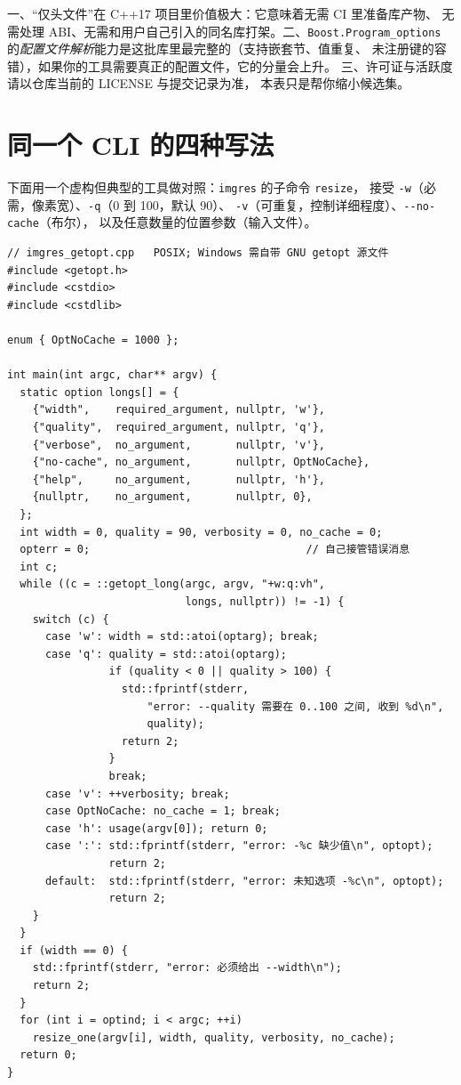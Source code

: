 \documentclass[12pt,a4paper,fontset=fandol]{ctexbook}
\newcommand{\cpp}[1]{C++#1}
\newcommand{\Tp}[1]{\texttt{#1}}
\newcommand{\Opt}[1]{\texttt{-\/-#1}}
\newcommand{\Short}[1]{\texttt{-#1}}
\newcommand{\Bk}{\allowbreak}
\begin{document}
\begin{note}[title={读这张表的三个正确姿势}]
一、``仅头文件''在 \cpp{17} 项目里价值极大：它意味着无需 CI 里准备库产物、
无需处理 ABI、无需和用户自己引入的同名库打架。二、\Tp{Boost\Bk.Program\Bk\_options}
的\emph{配置文件解析}能力是这批库里最完整的（支持嵌套节、值重复、
未注册键的容错），如果你的工具需要真正的配置文件，它的分量会上升。
三、许可证与活跃度请以仓库当前的 LICENSE 与提交记录为准，
本表只是帮你缩小候选集。
\end{note}

\section{同一个 CLI 的四种写法}

下面用一个虚构但典型的工具做对照：\Tp{imgres} 的子命令 \Tp{resize}，
接受 \Short{w}（必需，像素宽）、\Short{q}（0 到 100，默认 90）、
\Short{v}（可重复，控制详细程度）、\Opt{no-cache}（布尔），
以及任意数量的位置参数（输入文件）。

\begin{lstlisting}[caption={写法一：getopt\_long（可移植性最差但零依赖）}]
// imgres_getopt.cpp   POSIX; Windows 需自带 GNU getopt 源文件
#include <getopt.h>
#include <cstdio>
#include <cstdlib>

enum { OptNoCache = 1000 };

int main(int argc, char** argv) {
  static option longs[] = {
    {"width",    required_argument, nullptr, 'w'},
    {"quality",  required_argument, nullptr, 'q'},
    {"verbose",  no_argument,       nullptr, 'v'},
    {"no-cache", no_argument,       nullptr, OptNoCache},
    {"help",     no_argument,       nullptr, 'h'},
    {nullptr,    no_argument,       nullptr, 0},
  };
  int width = 0, quality = 90, verbosity = 0, no_cache = 0;
  opterr = 0;                                  // 自己接管错误消息
  int c;
  while ((c = ::getopt_long(argc, argv, "+w:q:vh",
                            longs, nullptr)) != -1) {
    switch (c) {
      case 'w': width = std::atoi(optarg); break;
      case 'q': quality = std::atoi(optarg);
                if (quality < 0 || quality > 100) {
                  std::fprintf(stderr,
                      "error: --quality 需要在 0..100 之间, 收到 %d\n",
                      quality);
                  return 2;
                }
                break;
      case 'v': ++verbosity; break;
      case OptNoCache: no_cache = 1; break;
      case 'h': usage(argv[0]); return 0;
      case ':': std::fprintf(stderr, "error: -%c 缺少值\n", optopt);
                return 2;
      default:  std::fprintf(stderr, "error: 未知选项 -%c\n", optopt);
                return 2;
    }
  }
  if (width == 0) {
    std::fprintf(stderr, "error: 必须给出 --width\n");
    return 2;
  }
  for (int i = optind; i < argc; ++i)
    resize_one(argv[i], width, quality, verbosity, no_cache);
  return 0;
}
\end{lstlisting}
\end{document}
